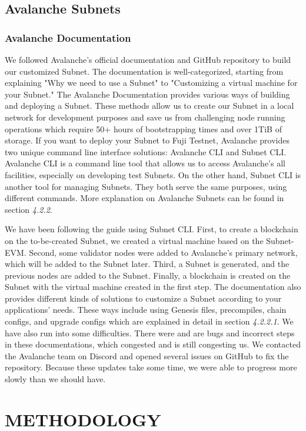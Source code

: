 \documentclass[a4paper,12pt]{report}
\begin{document}
\section{Avalanche Subnets}
\subsection{Avalanche Documentation}
We followed Avalanche's official documentation and GitHub repository to build our customized Subnet. The documentation is well-categorized, starting from explaining "Why we need to use a Subnet" to "Customizing a virtual machine for your Subnet." 
The Avalanche Documentation provides various ways of building and deploying a Subnet. These methods allow us to create our Subnet in a local network for development purposes and save us from challenging node running operations which require 50+ hours of bootstrapping times and over 1TiB of storage. If you want to deploy your Subnet to Fuji Testnet, Avalanche provides two unique command line interface solutions: Avalanche CLI and Subnet CLI. Avalanche CLI is a command line tool that allows us to access Avalanche's all facilities, especially on developing test Subnets. On the other hand, Subnet CLI is another tool for managing Subnets. They both serve the same purposes, using different commands. More explanation on Avalanche Subnets can be found in section \textit{4.2.2}. 

We have been following the guide using Subnet CLI. First, to create a blockchain on the to-be-created Subnet, we created a virtual machine based on the Subnet-EVM. Second, some validator nodes were added to Avalanche's primary network, which will be added to the Subnet later. Third, a Subnet is generated, and the previous nodes are added to the Subnet. Finally, a blockchain is created on the Subnet with the virtual machine created in the first step. The documentation also provides different kinds of solutions to customize a Subnet according to your applications' needs. These ways include using Genesis files, precompiles, chain configs, and upgrade configs which are explained in detail in section \textit{4.2.2.1}. We have also run into some difficulties. There were and are bugs and incorrect steps in these documentations, which congested and is still congesting us. We contacted the Avalanche team on Discord and opened several issues on GitHub to fix the repository. Because these updates take some time, we were able to progress more slowly than we should have.

\chapter{METHODOLOGY}
\end{document}
